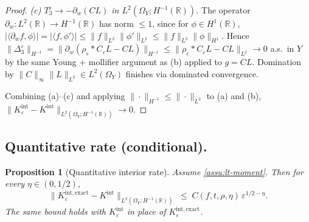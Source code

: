 \documentclass[11pt,reqno]{amsart}
\theoremstyle{plain}
\newtheorem{proposition}[theorem]{Proposition}
\theoremstyle{definition}
\theoremstyle{remark}
\newcommand{\R}{\mathbb{R}}
\begin{document}
\begin{proof}
\smallskip\noindent\emph{(c) $T_{3}^{\varepsilon}\to-\partial_{w}(CL)$
in $L^{2}(\Omega_{Y};H^{-1}(\R))$.}
The operator $\partial_{w}\colon L^{2}(\R)\to H^{-1}(\R)$ has norm
$\le 1$, since for $\phi\in H^{1}(\R)$,
$|\langle\partial_{w}f,\phi\rangle|=|\langle f,\phi'\rangle|\le\|f\|_{L^{2}}\|\phi'\|_{L^{2}}\le\|f\|_{L^{2}}\|\phi\|_{H^{1}}$.
Hence
$\|\Delta_{3}^{\varepsilon}\|_{H^{-1}}=\|\partial_{w}(\rho_{\varepsilon}*C_{\varepsilon}L-CL)\|_{H^{-1}}
\le\|\rho_{\varepsilon}*C_{\varepsilon}L-CL\|_{L^{2}}\to 0$ a.s.\ in $Y$
by the same Young + mollifier argument as (b) applied to $g=CL$.
Domination by $\|C\|_{\infty}\|L\|_{L^{2}}\in L^{2}(\Omega_{Y})$
finishes via dominated convergence.

\smallskip Combining (a)--(c) and applying
$\|\cdot\|_{H^{-1}}\le\|\cdot\|_{L^{2}}$ to (a) and (b),
$\|K_{\varepsilon}^{\mathrm{int}}-K^{\mathrm{int}}\|_{L^{2}(\Omega_{Y};H^{-1}(\R))}\to 0$.
\end{proof}

\subsection*{Quantitative rate (conditional).}

\begin{proposition}[Quantitative interior rate]\label{prop:interior-rate}
Assume \cref{assu:lt-moment}. Then for every
$\eta\in(0,1/2)$,
\begin{equation}\label{eq:int-rate}
 \bigl\|K_{\varepsilon}^{\mathrm{int,exact}}-K^{\mathrm{int}}\bigr\|_{L^{2}(\Omega_{Y};H^{-1}(\R))}
 \;\le\;C(f,t,\rho,\eta)\,\varepsilon^{1/2-\eta}.
\end{equation}
The same bound holds with $K_{\varepsilon}^{\mathrm{int}}$ in place
of $K_{\varepsilon}^{\mathrm{int,exact}}$.
\end{proposition}
\end{document}

